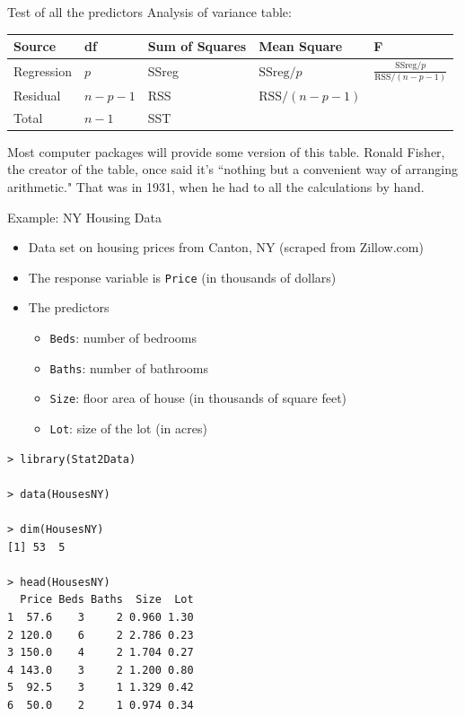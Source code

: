\documentclass[10pt]{beamer}\usepackage[]{graphicx}\usepackage[]{color}
\newcommand{\RSS}{\text{RSS}}
\newcommand{\SSreg}{\text{SSreg}}
\begin{document}
\begin{frame}{Test of all the predictors}
Analysis of variance table:\\

\begin{table}
\begin{tabular}{lllll}
\hline
Source & df & Sum of Squares & Mean Square & F\\
\hline
Regression & $p$ & SSreg & $\SSreg/p$ & $\frac{\SSreg / p}{\RSS / (n-p-1)}$\\
Residual & $n-p-1$ & RSS & $\RSS/(n-p-1)$ & \\
\hline
Total & $n-1$ & SST & &\\ 
\end{tabular}
\end{table}

Most computer packages will provide some version of this table.  Ronald Fisher, the creator of the table, once said it's ``nothing but a convenient way of arranging arithmetic."  That was in 1931, when he had to all the calculations by hand.\\
\end{frame}

\begin{frame}{Example: NY Housing Data}
\begin{itemize}
\item Data set on housing prices from Canton, NY (scraped from Zillow.com)
\vspace{5pt}
\item The response variable is \texttt{Price} (in thousands of dollars)
\vspace{5pt}
\item The predictors
\begin{itemize}
\item \texttt{Beds}: number of bedrooms
\item \texttt{Baths}: number of bathrooms
\item \texttt{Size}: floor area of house (in thousands of square feet)
\item \texttt{Lot}: size of the lot (in acres)
\end{itemize}
\end{itemize}
\end{frame}

\begin{frame}[fragile]
\small
\begin{verbatim}
> library(Stat2Data)

> data(HousesNY)

> dim(HousesNY)
[1] 53  5

> head(HousesNY)
  Price Beds Baths  Size  Lot
1  57.6    3     2 0.960 1.30
2 120.0    6     2 2.786 0.23
3 150.0    4     2 1.704 0.27
4 143.0    3     2 1.200 0.80
5  92.5    3     1 1.329 0.42
6  50.0    2     1 0.974 0.34
\end{verbatim}
\end{frame}
\end{document}
